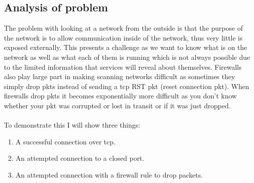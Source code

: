 \documentclass[titlepage]{article}
\let\Oldsubsection\subsection{}
\renewcommand{\subsection}{\FloatBarrier\Oldsubsection}
\begin{document}
\lstset{language=HTML}


\subsection{Analysis of problem}

The problem with looking at a network from the outside is that the purpose of the network is to 
allow communication inside of the network, thus very little is exposed externally. This presents a 
challenge as we want to know what is on the network as well as what each of them is running which is 
not always possible due to the limited information that \glspl{service} will reveal about 
themselves. Firewalls also play large part in making scanning networks difficult as sometimes they 
simply drop \glspl{pkt} instead of sending a \gls{tcp} RST \gls{pkt} (reset connection \gls{pkt}). 
When firewalls drop \glspl{pkt} it becomes exponentially more difficult as you don't know whether 
your \gls{pkt} was corrupted or lost in transit or if it was just dropped. \\\\ To demonstrate this 
I will show three things:

\begin{enumerate}
  \item{A successful connection over \gls{tcp}.}
  \item{An attempted connection to a closed port.}
  \item{An attempted connection with a firewall rule to drop packets.}
\end{enumerate}
\end{document}
